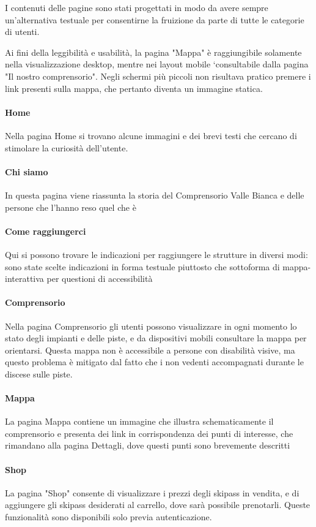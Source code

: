 I contenuti delle pagine sono stati progettati in modo da avere sempre un'alternativa testuale per consentirne la fruizione da parte di tutte le categorie di utenti.

Ai fini della leggibilità e usabilità, la pagina "Mappa" è raggiungibile solamente nella visualizzazione desktop, mentre nei layout mobile `consultabile dalla pagina "Il nostro comprensorio".
Negli schermi più piccoli non risultava pratico premere i link presenti sulla mappa, che pertanto diventa un immagine statica.
\paragraph{Home} Nella pagina Home si trovano alcune immagini e dei brevi testi che cercano di stimolare la curiosità dell'utente.
\paragraph{Chi siamo}
In questa pagina viene riassunta la storia del Comprensorio Valle Bianca e delle persone che l'hanno reso quel che è
\paragraph{Come raggiungerci}
Qui si possono trovare le indicazioni per raggiungere le strutture in diversi modi: sono state scelte indicazioni in forma testuale piuttosto che sottoforma di mappa-interattiva per questioni di accessibilità
\paragraph{Comprensorio}
Nella pagina Comprensorio gli utenti possono visualizzare in ogni momento lo stato degli impianti e delle piste, e da dispositivi mobili consultare la mappa per orientarsi. Questa mappa non è accessibile a persone con disabilità visive, ma questo problema è mitigato dal fatto che i non vedenti accompagnati durante le discese sulle piste.
\paragraph{Mappa}
La pagina Mappa contiene un immagine che illustra schematicamente il comprensorio e presenta dei link in corrispondenza dei punti di interesse, che rimandano alla pagina Dettagli, dove  questi punti sono brevemente descritti
\paragraph{Shop}
La pagina "Shop" consente di visualizzare i prezzi degli skipass in vendita, e di aggiungere gli skipass desiderati al carrello, dove sarà possibile prenotarli. Queste funzionalità sono disponibili solo previa autenticazione.
